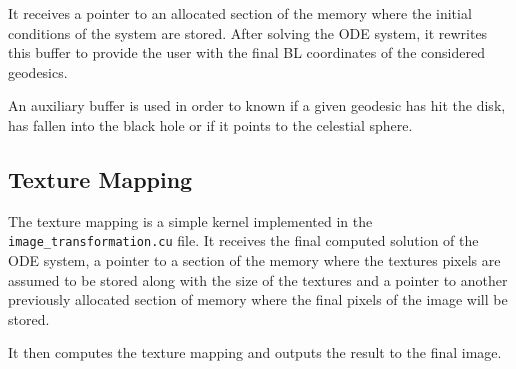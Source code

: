 It receives a pointer to an allocated section of the memory where the initial conditions of the system are stored. After solving the \ac{ODE} system, it rewrites this buffer to provide the user with the final \ac{BL} coordinates of the considered geodesics.

An auxiliary buffer is used in order to known if a given geodesic has hit the disk, has fallen into the black hole or if it points to the celestial sphere.

\subsection{Texture Mapping}

The texture mapping is a simple kernel implemented in the \lstinline{image_transformation.cu} file. It receives the final computed solution of the \ac{ODE} system, a pointer to a section of the memory where the textures pixels are assumed to be stored along with the size of the textures and a pointer to another previously allocated section of memory where the final pixels of the image will be stored.

It then computes the texture mapping and outputs the result to the final image.